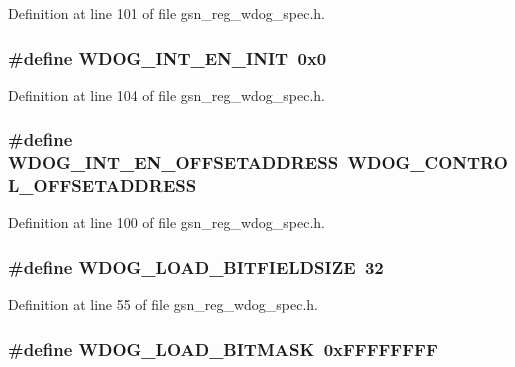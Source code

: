 Definition at line 101 of file gsn\_\-reg\_\-wdog\_\-spec.h.

\hypertarget{a00577_a23a8afbfb948ae01a4360ad4ff0a9047}{
\subsubsection[{WDOG\_\-INT\_\-EN\_\-INIT}]{\setlength{\rightskip}{0pt plus 5cm}\#define WDOG\_\-INT\_\-EN\_\-INIT~0x0}}
\label{a00577_a23a8afbfb948ae01a4360ad4ff0a9047}


Definition at line 104 of file gsn\_\-reg\_\-wdog\_\-spec.h.

\hypertarget{a00577_a8ba515cdefaacabdc710247515eb899a}{
\subsubsection[{WDOG\_\-INT\_\-EN\_\-OFFSETADDRESS}]{\setlength{\rightskip}{0pt plus 5cm}\#define WDOG\_\-INT\_\-EN\_\-OFFSETADDRESS~WDOG\_\-CONTROL\_\-OFFSETADDRESS}}
\label{a00577_a8ba515cdefaacabdc710247515eb899a}


Definition at line 100 of file gsn\_\-reg\_\-wdog\_\-spec.h.

\hypertarget{a00577_a5f5eb49649ef4f62eb74fd68a25db46f}{
\subsubsection[{WDOG\_\-LOAD\_\-BITFIELDSIZE}]{\setlength{\rightskip}{0pt plus 5cm}\#define WDOG\_\-LOAD\_\-BITFIELDSIZE~32}}
\label{a00577_a5f5eb49649ef4f62eb74fd68a25db46f}


Definition at line 55 of file gsn\_\-reg\_\-wdog\_\-spec.h.

\hypertarget{a00577_afcb94e5491a9e62010275ac3a6426141}{
\subsubsection[{WDOG\_\-LOAD\_\-BITMASK}]{\setlength{\rightskip}{0pt plus 5cm}\#define WDOG\_\-LOAD\_\-BITMASK~0xFFFFFFFF}}
\label{a00577_afcb94e5491a9e62010275ac3a6426141}


